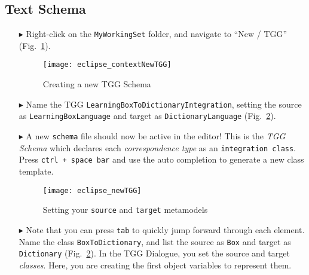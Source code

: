 \newpage
\hypertarget{schema tex}{}
\subsection{Text Schema}
\texHeader


\begin{itemize}

\item[$\blacktriangleright$] Right-click on the \texttt{MyWorkingSet} folder, and navigate to ``New / TGG'' (Fig.~\ref{fig:contextTGG}).

\vspace{0.5cm}

\begin{figure}[htbp]
\begin{center}
  \texttt{[image: eclipse\_contextNewTGG]}
  \caption{Creating a new TGG Schema}
  \label{fig:contextTGG}
\end{center}
\end{figure}

\item[$\blacktriangleright$] Name the TGG \texttt{LearningBoxToDictionaryIntegration}, setting the source as \texttt{LearningBoxLanguage} and target as
\texttt{DictionaryLanguage} (Fig.~\ref{fig:newTGG}).

\item[$\blacktriangleright$] A new \texttt{schema} file should now be active in the editor! This is the \emph{TGG Schema} which declares each
\emph{correspondence type} as an \texttt{integration class}. Press \texttt{ctrl + space bar} and use the auto completion to generate a new class template.

\newpage

\begin{figure}[htbp]
\begin{center}
  \texttt{[image: eclipse\_newTGG]}
  \caption{Setting your \texttt{source} and \texttt{target} metamodels}
  \label{fig:newTGG}
\end{center}
\end{figure}

\item[$\blacktriangleright$] Note that you can press \texttt{tab} to quickly jump forward through each element. Name the class \texttt{BoxToDictionary}, and
list the source as \texttt{Box} and target as \texttt{Dictionary} (Fig.~\ref{fig:newTGG}). In the TGG Dialogue, you set the source and target \emph{classes}.
Here, you are creating the first object variables to represent them. 


\end{itemize}
